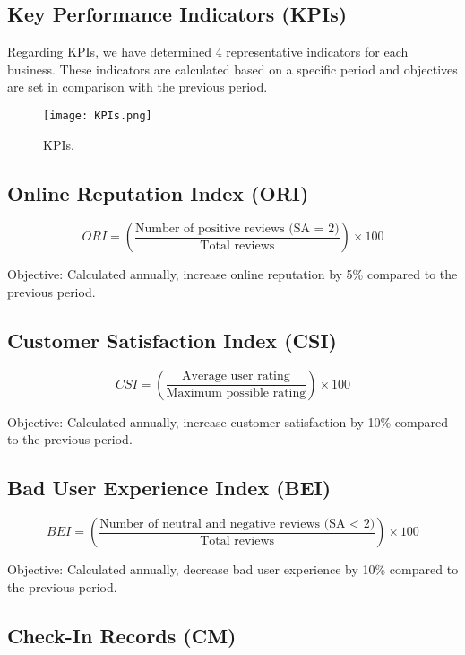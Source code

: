 \documentclass[12pt]{article}
\begin{document}
\subsection{Key Performance Indicators (KPIs)}

Regarding KPIs, we have determined 4 representative indicators for each business. These indicators are calculated based on a specific period and objectives are set in comparison with the previous period.

\begin{figure}[H]
  \centering
  \texttt{[image: KPIs.png]}
  \caption{KPIs.}
  \label{fig: KPIs}
\end{figure}

\subsection*{Online Reputation Index (ORI)}

\[ ORI = \left(\frac{\text{Number of positive reviews (SA = 2)}}{\text{Total reviews}}\right) \times 100 \]

Objective: Calculated annually, increase online reputation by 5\% compared to the previous period.

\subsection*{Customer Satisfaction Index (CSI)}

\[ CSI = \left(\frac{\text{Average user rating}}{\text{Maximum possible rating}}\right) \times 100 \]

Objective: Calculated annually, increase customer satisfaction by 10\% compared to the previous period.

\subsection*{Bad User Experience Index (BEI)}

\[ BEI = \left(\frac{\text{Number of neutral and negative reviews (SA < 2)}}{\text{Total reviews}}\right) \times 100 \]

Objective: Calculated annually, decrease bad user experience by 10\% compared to the previous period.

\subsection*{Check-In Records (CM)}
\end{document}
